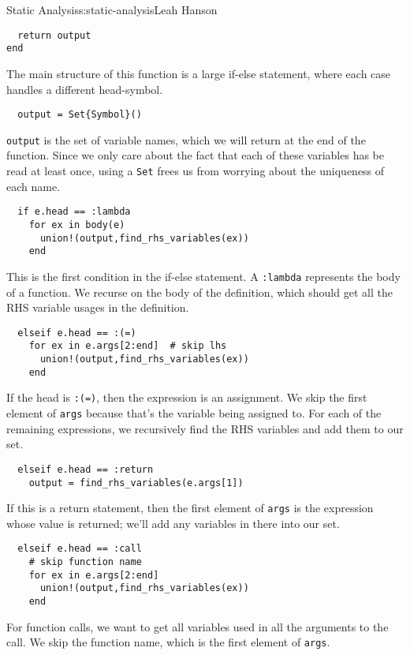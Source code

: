 \begin{aosachapter}{Static Analysis}{s:static-analysis}{Leah Hanson}
\begin{verbatim}
  return output
end
\end{verbatim}

The main structure of this function is a large if-else statement, where
each case handles a different head-symbol.

\begin{verbatim}
  output = Set{Symbol}()
\end{verbatim}

\texttt{output} is the set of variable names, which we will return at
the end of the function. Since we only care about the fact that each of
these variables has be read at least once, using a \texttt{Set} frees us
from worrying about the uniqueness of each name.

\begin{verbatim}
  if e.head == :lambda
    for ex in body(e)
      union!(output,find_rhs_variables(ex))
    end
\end{verbatim}

This is the first condition in the if-else statement. A \texttt{:lambda}
represents the body of a function. We recurse on the body of the
definition, which should get all the RHS variable usages in the
definition.

\begin{verbatim}
  elseif e.head == :(=)
    for ex in e.args[2:end]  # skip lhs
      union!(output,find_rhs_variables(ex))
    end
\end{verbatim}

If the head is \texttt{:(=)}, then the expression is an assignment. We
skip the first element of \texttt{args} because that's the variable
being assigned to. For each of the remaining expressions, we recursively
find the RHS variables and add them to our set.

\begin{verbatim}
  elseif e.head == :return
    output = find_rhs_variables(e.args[1])
\end{verbatim}

If this is a return statement, then the first element of \texttt{args}
is the expression whose value is returned; we'll add any variables in
there into our set.

\begin{verbatim}
  elseif e.head == :call
    # skip function name
    for ex in e.args[2:end]
      union!(output,find_rhs_variables(ex))
    end
\end{verbatim}

For function calls, we want to get all variables used in all the
arguments to the call. We skip the function name, which is the first
element of \texttt{args}.


\end{aosachapter}
